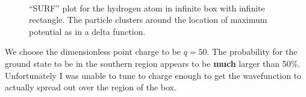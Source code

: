 \documentclass[singlepage,notitlepage,nofootinbib,11pt]{revtex4-1}
\begin{document}
\begin{figure}[h]
  \centering
  \captionsetup[subfigure]{labelformat=empty}
  \\
\caption{\label{lanczos} ``SURF'' plot for the hydrogen atom in infinite box with infinite rectangle. The particle clusters around the location of maximum potential as in a delta function.}
\end{figure}
  We choose the dimensionless point charge to be $q=50$. The probability for the ground state to be in the southern region appears to be {\bf much} larger than 50\%. Unfortunately I was unable to tune to charge enough to get the wavefunction to actually spread out over the region of the box.
\end{document}
